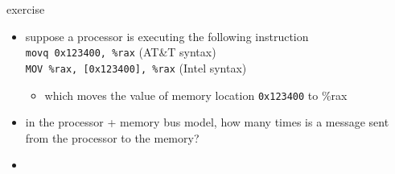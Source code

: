 \begin{frame}{exercise}
    \begin{itemize}
    \item suppose a processor is executing the following instruction \\
        \texttt{movq 0x123400, \%rax} (AT\&T syntax) \\
        \texttt{MOV \%rax, [0x123400], \%rax} (Intel syntax)
        \begin{itemize}
            \item which moves the value of memory location \texttt{0x123400} to \%rax
        \end{itemize}
    \item in the processor + memory bus model, how many times is a message sent
        from the processor to the memory?
    \item<2> \iftoggle{heldback}{~}{answer: 2 (retrieve instruction + ask for address 0x123400)}
    \end{itemize}
\end{frame}
